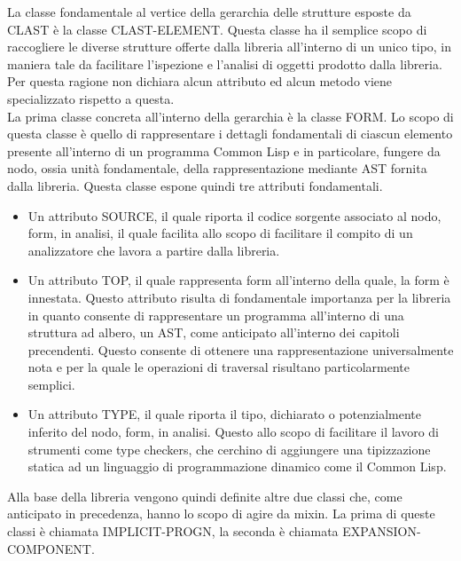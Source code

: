 La classe fondamentale al vertice della gerarchia delle strutture esposte da
CLAST è la classe CLAST-ELEMENT. Questa classe ha il semplice scopo di
raccogliere le diverse strutture offerte dalla libreria all'interno di un
unico tipo, in maniera tale da facilitare l’ispezione e l’analisi di oggetti
prodotto dalla libreria. Per questa ragione non dichiara alcun attributo ed
alcun metodo viene specializzato rispetto a questa.\\

La prima classe concreta all’interno della gerarchia è la classe FORM. Lo
scopo di questa classe è quello di rappresentare i dettagli fondamentali di
ciascun elemento presente all’interno di un programma Common Lisp e in
particolare, fungere da nodo, ossia unità fondamentale, della rappresentazione
mediante AST fornita dalla libreria. Questa classe espone quindi tre attributi
fondamentali.\\

\begin{itemize}

\item Un attributo SOURCE, il quale riporta il codice sorgente associato al
nodo, form, in analisi, il quale facilita allo scopo di facilitare il compito
di un analizzatore che lavora a partire dalla libreria.

\item Un attributo TOP,  il quale rappresenta form all’interno della quale, la
form è innestata. Questo attributo risulta di fondamentale importanza per la
libreria in quanto consente di rappresentare un programma all’interno di una
struttura ad albero, un AST, come anticipato all’interno dei capitoli
precendenti. Questo consente di ottenere una rappresentazione universalmente
nota e per la quale le operazioni di traversal risultano particolarmente
semplici.

\item Un attributo TYPE, il quale riporta il tipo, dichiarato o potenzialmente
inferito del nodo, form, in analisi. Questo allo scopo di facilitare il lavoro
di strumenti come type checkers, che cerchino di aggiungere una tipizzazione
statica ad un linguaggio di programmazione dinamico come il Common Lisp.\\

\end{itemize}

Alla base della libreria vengono quindi definite altre due classi che, come
anticipato in precedenza, hanno lo scopo di agire da mixin. La prima di queste
classi è chiamata IMPLICIT-PROGN, la seconda è chiamata EXPANSION-COMPONENT.\\

